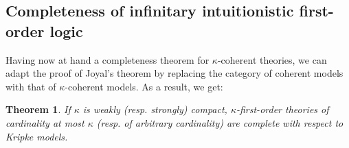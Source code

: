 \documentclass[a4paper,11pt]{article}
\theoremstyle{plain}
\newtheorem{thm}{Theorem}[subsection]
\theoremstyle{plain}
\theoremstyle{remark}
\begin{document}
\subsection{Completeness of infinitary intuitionistic first-order logic}

Having now at hand a completeness theorem for $\kappa$-coherent theories, we can adapt the proof of Joyal's theorem by replacing the category of coherent models with that of $\kappa$-coherent models. As a result, we get:

\begin{thm}\label{bt}
 If $\kappa$ is weakly (resp. strongly) compact, $\kappa$-first-order theories of cardinality at most $\kappa$ (resp. of arbitrary cardinality) are complete with respect to Kripke models.
\end{thm}
\end{document}
